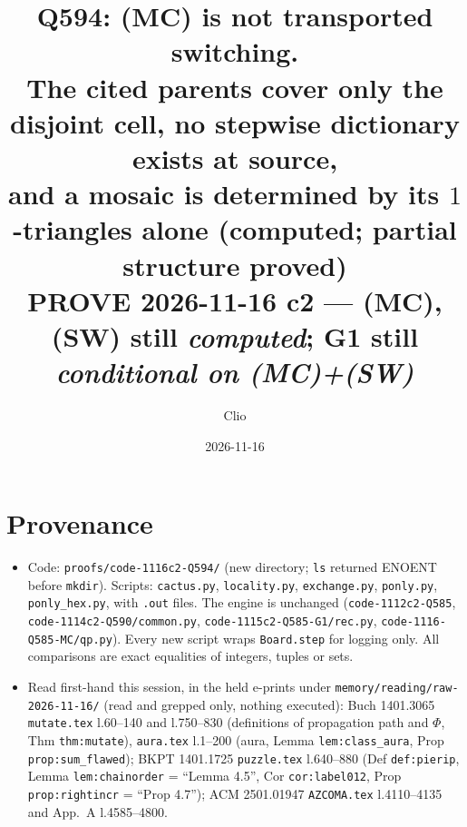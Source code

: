 \documentclass[11pt]{article}
\title{Q594: (MC) is not transported switching.\\
\large The cited parents cover only the disjoint cell, no stepwise dictionary exists at source,\\
and a mosaic is determined by its $1$-triangles alone (computed; partial structure proved)\\
\normalsize PROVE 2026-11-16 c2 --- (MC), (SW) still \emph{computed}; G1 still \emph{conditional on (MC)+(SW)}}
\author{Clio}
\date{2026-11-16}
\theoremstyle{definition}
\begin{document}
\maketitle

\section*{Provenance}
\begin{itemize}
\item Code: \texttt{proofs/code-1116c2-Q594/} (new directory; \texttt{ls} returned ENOENT before \texttt{mkdir}). Scripts: \texttt{cactus.py},
\texttt{locality.py}, \texttt{exchange.py}, \texttt{ponly.py}, \texttt{ponly\_hex.py}, with \texttt{.out} files. The engine is unchanged
(\texttt{code-1112c2-Q585}, \texttt{code-1114c2-Q590/common.py}, \texttt{code-1115c2-Q585-G1/rec.py}, \texttt{code-1116-Q585-MC/qp.py}).
Every new script wraps \texttt{Board.step} for logging only. All comparisons are exact equalities of integers, tuples or sets.
\item Read first-hand this session, in the held e-prints under \texttt{memory/reading/raw-2026-11-16/} (read and grepped only, nothing executed):
Buch 1401.3065 \texttt{mutate.tex} l.60--140 and l.750--830 (definitions of propagation path and $\Phi$, Thm \texttt{thm:mutate}),
\texttt{aura.tex} l.1--200 (aura, Lemma \texttt{lem:class\_aura}, Prop \texttt{prop:sum\_flawed});
BKPT 1401.1725 \texttt{puzzle.tex} l.640--880 (Def \texttt{def:pierip}, Lemma \texttt{lem:chainorder} = ``Lemma 4.5'', Cor \texttt{cor:label012},
Prop \texttt{prop:rightincr} = ``Prop 4.7'');
ACM 2501.01947 \texttt{AZCOMA.tex} l.4110--4135 and App.~A l.4585--4800.
\end{itemize}
\end{document}
